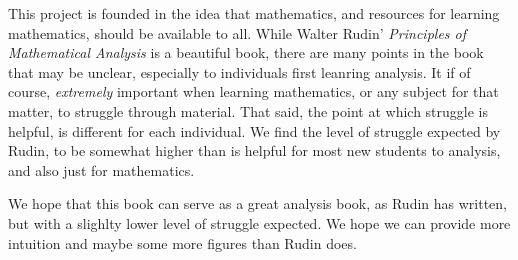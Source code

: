 
This project is founded in the idea that mathematics, and resources for
learning mathematics, should be available to all. While Walter Rudin'
\emph{Principles of Mathematical Analysis} is a beautiful book, there are many
points in the book that may be unclear, especially to individuals first
leanring analysis. It if of course, \emph{extremely} important when learning
mathematics, or any subject for that matter, to struggle through material. That
said, the point at which struggle is helpful, is different for each individual.
We find the level of struggle expected by Rudin, to be somewhat higher than is
helpful for most new students to analysis, and also just for mathematics.

We hope that this book can serve as a great analysis book, as Rudin has
written, but with a slighlty lower level of struggle expected. We hope we can
provide more intuition and maybe some more figures than Rudin does.
